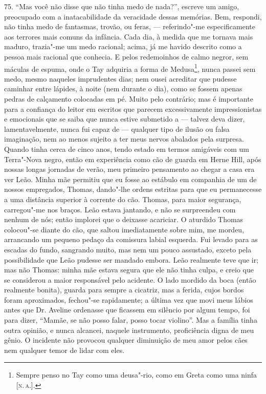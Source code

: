 75. ``Mas você não disse que não tinha medo de nada?'', escreve um
amigo, preocupado com a inatacabilidade da veracidade dessas memórias.
Bem, respondi, não tinha medo de fantasmas, trovão, ou feras, ---
referindo"-me especificamente aos terrores mais comuns da infância. Cada
dia, à medida que me tornava mais maduro, trazia"-me um medo racional;
acima, já me havido descrito como a pessoa mais racional que conhecia. E
pelos redemoinhos de calmo negror, sem máculas de espuma, onde o Tay
adquiria a forma de Medusa\footnote{Sempre penso no Tay como uma
  deusa"-rio, como em Greta como uma ninfa {[}\textsc{n.\,a.}{]}.}, nunca passei
sem medo, mesmo naqueles imprudentes dias; nem ousei acreditar que
pudesse caminhar entre lápides, à noite (nem durante o dia), como se
fossem apenas pedras de calçamento colocadas em pé. Muito pelo
contrário; mas é importante para a confiança do leitor em escritos que
parecem excessivamente impressionistas e emocionais que se saiba que
nunca estive submetido a --- talvez deva dizer, lamentavelmente, nunca
fui capaz de --- qualquer tipo de ilusão ou falsa imaginação, nem ao
menos sujeito a ter meus nervos abalados pela surpresa. Quando tinha
cerca de cinco anos, tendo estado em termos amigáveis com um Terra"-Nova
negro, então em experiência como cão de guarda em Herne Hill, após
nossas longas jornadas de verão, meu primeiro pensamento ao chegar a
casa era ver Leão. Minha mãe permitiu que eu fosse ao estábulo em
companhia de um de nossos empregados, Thomas, dando"-lhe ordens estritas
para que eu permanecesse a uma distância superior à corrente do cão.
Thomas, para maior segurança, carregou"-me nos braços. Leão estava
jantando, e não se surpreendeu com nenhum de nós; então implorei que o
deixasse acariciar. O aturdido Thomas colocou"-se diante do cão, que
saltou imediatamente sobre mim, me mordeu, arrancando um pequeno pedaço
da comissura labial esquerda. Fui levado para as escadas do fundo,
sangrando muito, mas nem um pouco assustado, exceto pela possibilidade
que Leão pudesse ser mandado embora. Leão realmente teve que ir; mas não
Thomas: minha mãe estava segura que ele não tinha culpa, e creio que se
considerou a maior responsável pelo acidente. O lado mordido da boca
(então realmente bonita), guarda para sempre a cicatriz, mas a ferida,
cujos bordos foram aproximados, fechou"-se rapidamente; a última vez que
movi meus lábios antes que Dr. Aveline ordenasse que ficassem em
silêncio por algum tempo, foi para dizer, ``Mamãe, se não posso falar,
posso tocar violino''. Mas a família tinha outra opinião, e nunca
alcancei, naquele instrumento, proficiência digna de meu gênio. O
incidente não provocou qualquer diminuição de meu amor pelos cães nem
qualquer temor de lidar com eles.

